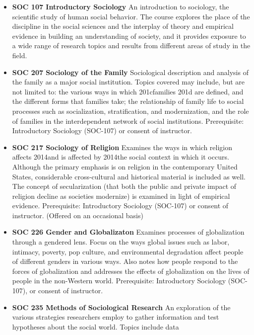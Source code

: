 \documentclass[
  letterpaper,
]{scrbook}
\providecommand{\tightlist}{%
  \setlength{\itemsep}{0pt}\setlength{\parskip}{0pt}}
\begin{document}
\begin{itemize}
\tightlist
\item
  \textbf{SOC 107 Introductory Sociology} An introduction to sociology,
  the scientific study of human social behavior. The course explores the
  place of the discipline in the social sciences and the interplay of
  theory and empirical evidence in building an understanding of society,
  and it provides exposure to a wide range of research topics and
  results from different areas of study in the field.\\
\item
  \textbf{SOC 207 Sociology of the Family} Sociological description and
  analysis of the family as a major social institution. Topics covered
  may include, but are not limited to: the various ways in which
  201cfamilies 201d are defined, and the different forms that families
  take; the relationship of family life to social processes such as
  socialization, stratification, and modernization, and the role of
  families in the interdependent network of social institutions.
  Prerequisite: Introductory Sociology (SOC-107) or consent of
  instructor.
\item
  \textbf{SOC 217 Sociology of Religion} Examines the ways in which
  religion affects 2014and is affected by 2014the social context in
  which it occurs. Although the primary emphasis is on religion in the
  contemporary United States, considerable cross-cultural and historical
  material is included as well. The concept of secularization (that both
  the public and private impact of religion decline as societies
  modernize) is examined in light of empirical evidence. Prerequisite:
  Introductory Sociology (SOC-107) or consent of instructor. (Offered on
  an occasional basis)\\
\item
  \textbf{SOC 226 Gender and Globalizaton} Examines processes of
  globalization through a gendered lens. Focus on the ways global issues
  such as labor, intimacy, poverty, pop culture, and environmental
  degradation affect people of different genders in various ways. Also
  notes how people respond to the forces of globalization and addresses
  the effects of globalization on the lives of people in the non-Western
  world. Prerequisite: Introductory Sociology (SOC-107), or consent of
  instructor.
\item
  \textbf{SOC 235 Methods of Sociological Research} An exploration of
  the various strategies researchers employ to gather information and
  test hypotheses about the social world. Topics include data

\end{itemize}
\end{document}
